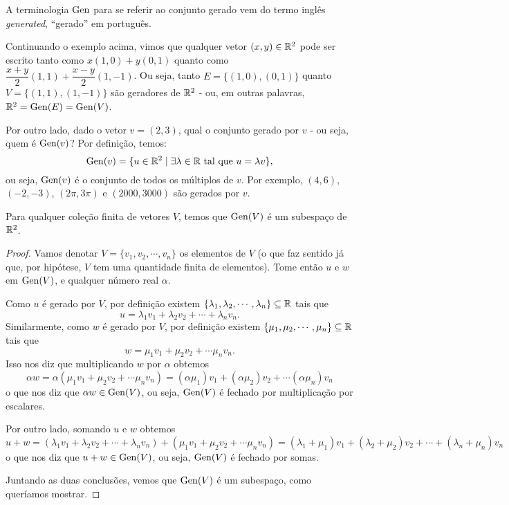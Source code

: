 \begin{rmk}
	A terminologia $\operatorname{Gen}$ para se referir ao conjunto gerado vem do termo inglês \emph{generated}, ``gerado'' em português.
\end{rmk}

\begin{ex}
	Continuando o exemplo acima, vimos que qualquer vetor $(x,y)\in\mathbb R^2$ pode ser escrito tanto como $x(1,0)+y(0,1)$ quanto como $\dfrac{x+y}{2}(1,1)+\dfrac{x-y}{2}(1,-1)$. Ou seja, tanto $E=\{(1,0),(0,1)\}$ quanto $V=\{(1,1),(1,-1)\}$ são geradores de $\mathbb R^2$ - ou, em outras palavras, $\mathbb R^2=\operatorname{Gen}(E)=\operatorname{Gen}(V)$.
	
	Por outro lado, dado o vetor $v=(2,3)$, qual o conjunto gerado por $v$ - ou seja, quem é $\operatorname{Gen}(v)$? Por definição, temos:
	\[\operatorname{Gen}(v)=\{u\in\mathbb R^2\mid \exists\lambda\in\mathbb R\mbox{ tal que }u=\lambda v\},\]ou seja, $\operatorname{Gen}(v)$ é o conjunto de todos os múltiplos de $v$. Por exemplo, $(4,6)$, $(-2,-3)$, $(2\pi,3\pi)$ e $(2000,3000)$ são gerados por $v$.
\end{ex}

\begin{prop}
	Para qualquer coleção finita de vetores $V$, temos que $\operatorname{Gen}(V)$ é um subespaço de $\mathbb R^2$.
\end{prop}
\begin{proof}
	Vamos denotar $V=\{v_1,v_2,\cdots,v_n\}$ os elementos de $V$ (o que faz sentido já que, por hipótese, $V$ tem uma quantidade finita de elementos). Tome então $u$ e $w$ em $\operatorname{Gen}(V)$, e qualquer número real $\alpha$.
	
	Como $u$ é gerado por $V$, por definição existem $\{\lambda_1,\lambda_2,\cdots,\lambda_n\}\subseteq\mathbb R$ tais que 
	\[u=\lambda_1v_1+\lambda_2v_2+\cdots+\lambda_nv_n.\]Similarmente, como $w$ é gerado por $V$, por definição existem $\{\mu_1,\mu_2,\cdots,\mu_n\}\subseteq\mathbb R$ tais que
	\[w=\mu_1v_1+\mu_2v_2+\cdots\mu_nv_n.\]Isso nos diz que multiplicando $w$ por $\alpha$ obtemos
	\[\alpha w=\alpha(\mu_1v_1+\mu_2v_2+\cdots\mu_nv_n)=(\alpha\mu_1)v_1+(\alpha\mu_2)v_2+\cdots(\alpha\mu_n)v_n\]o que nos diz que $\alpha w\in\operatorname{Gen}(V)$, ou seja, $\operatorname{Gen}(V)$ é fechado por multiplicação por escalares.
	
	Por outro lado, somando $u$ e $w$ obtemos
	\[u+w=(\lambda_1v_1+\lambda_2v_2+\cdots+\lambda_nv_n)+(\mu_1v_1+\mu_2v_2+\cdots\mu_nv_n)=(\lambda_1+\mu_1)v_1+(\lambda_2+\mu_2)v_2+\cdots+(\lambda_n+\mu_n)v_n\]o que nos diz que $u+w\in\operatorname{Gen}(V)$, ou seja, $\operatorname{Gen}(V)$ é fechado por somas.
	
	Juntando as duas conclusões, vemos que $\operatorname{Gen}(V)$ é um subespaço, como queríamos mostrar.
\end{proof}

